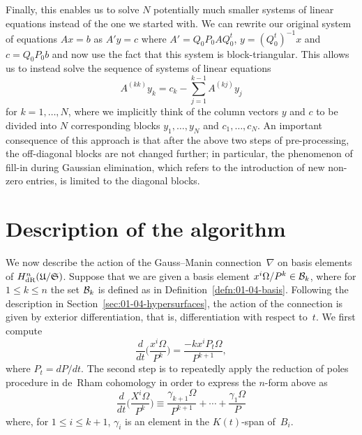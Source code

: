 Finally, this enables us to solve $N$ potentially much smaller systems of 
linear equations instead of the one we started with.  We can rewrite our 
original system of equations $Ax = b$ as $A' y = c$ where 
$A' = Q_0 P_0 A Q_0^t$, $y = (Q_0^t)^{-1} x$ and $c = Q_0 P_0 b$ and now use 
the fact that this system is block-triangular.  This allows us to instead 
solve the sequence of systems of linear equations 
\begin{equation}
A^{(kk)} y_k = c_k - \sum_{j=1}^{k-1} A^{(kj)} y_j
\end{equation}
for $k = 1, \dotsc, N$, where we implicitly think of the column vectors $y$ 
and $c$ to be divided into $N$ corresponding blocks $y_1, \dotsc, y_N$ and 
$c_1, \dotsc, c_N$.  An important consequence of this approach is that after 
the above two steps of pre-processing, the off-diagonal blocks are not changed 
further;  in particular, the phenomenon of fill-in during Gaussian 
elimination, which refers to the introduction of new non-zero entries, is 
limited to the diagonal blocks.


\section{Description of the algorithm}

We now describe the action of the Gauss--Manin connection~$\nabla$ on 
basis elements of $H_{\text{dR}}^n(\mathfrak{U}/\mathfrak{S})$.  Suppose that we are 
given a basis element $x^i \Omega / P^k \in \mathcal{B}_k$, where for 
$1 \leq k \leq n$ the set $\mathcal{B}_k$ is defined as in 
Definition~\ref{defn:01-04-basis}.  Following the description in 
Section~\ref{sec:01-04-hypersurfaces}, the action of the connection 
is given by exterior differentiation, that is, differentiation with respect 
to~$t$.  We first compute 
\begin{equation*}
\frac{d}{dt} \biggl(\frac{x^i \Omega}{P^k}\biggr) = \frac{-k x^i P_t \Omega}{P^{k+1}},
\end{equation*}
where $P_t = dP/dt$.  The second step is to repeatedly apply the reduction of 
poles procedure in de~Rham cohomology in order to express the $n$-form above 
as 
\begin{equation*}
\frac{d}{dt} \biggl(\frac{X^i \Omega}{P^k}\biggr) \equiv 
    \frac{\gamma_{k+1} \Omega}{P^{k+1}} + \dotsb + \frac{\gamma_1 \Omega}{P}
\end{equation*}
where, for $1 \leq i \leq k+1$, $\gamma_i$ is an element in the $K(t)$-span 
of~$B_i$.

